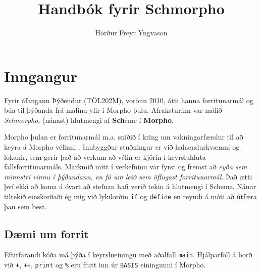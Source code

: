 \documentclass[a4paper,icelandic]{article}
\title{Handbók fyrir Schmorpho}
\author{Hörður Freyr Yngvason}
\begin{document}
\maketitle

\section{Inngangur}
Fyrir áfangann Þýðendur (TÖL202M), vorönn 2010, átti hanna
forritunarmál og búa til þýðanda frá málinu yfir í Morpho
þulu. Afraksturinn var málið \emph{Schmorpho}, (nánast) hlutmengi af
\textbf{Sch}eme í \textbf{Morpho}.

Morpho þulan er forritunarmál m.a. sniðið í kring um vakningarfærslur til
að keyra á Morpho vélinni \cite{morphodist}. Innbyggður stuðningur er
við halaendurkvæmni og lokanir, sem gerir það að verkum að vélin er
kjörin í keyrsluhluta fallsforritunarmáls. Markmið mitt í verkefninu
var fyrst og fremst að \emph{eyða sem minnstri vinnu í þýðandann, en
  fá um leið sem öflugast forritunarmál}. Það ætti því ekki að koma á
óvart að stefnan hafi verið tekin á hlutmengi í Scheme. Nánar tiltekið
einskorðaði ég mig við lykilorðin \verb|if| og \verb|define| en reyndi
á móti að útfæra þau sem best. 

\subsection{Dæmi um forrit}
\label{sec:dami-um-forrit}

Eftirfarandi kóða má þýða í keyrslueiningu með aðalfall
\verb|main|. Hjálparföll á borð við \verb|+|, \verb|++|,
\verb|print| og \verb|%| eru flutt inn úr \verb|BASIS|
einingunni í Morpho. 


\end{document}
